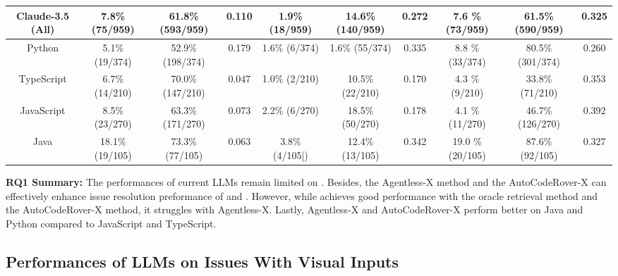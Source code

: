 \begin{table}[t]
{\begin{tabular}{cccccccccc}
    \textbf{Claude-3.5 (All)} &7.8\% (75/959) & 61.8\% (593/959) & 0.110 & 1.9\% 
 (18/959)& 14.6\%(140/959)& 0.272 &7.6 \% (73/959) & 61.5\% (590/959) & 0.325 \\
    \midrule
    \quad Python & 5.1\% (19/374) & 52.9\% (198/374) & 0.179 & 1.6\%  (6/374)& 1.6\% (55/374) &0.335 &8.8 \% (33/374) & 80.5\% (301/374) & 0.260\\
    \quad TypeScript & 6.7\% (14/210) & 70.0\% (147/210) & 0.047 & 1.0\% (2/210) & 10.5\% 
 (22/210)& 0.170 &4.3 \% (9/210) & 33.8\% (71/210) & 0.353 \\
    \quad JavaScript & 8.5\%  (23/270)& 63.3\% (171/270) & 0.073 & 2.2\% (6/270)& 18.5\% (50/270) & 0.178 &4.1 \% (11/270) & 46.7\% (126/270) & 0.392\\
    \quad Java & 18.1\% (19/105) & 73.3\% (77/105) & 0.063 &3.8\% (4/105|)& 12.4\% (13/105) & 0.342 &19.0 \% (20/105) & 87.6\% (92/105) & 0.327\\
    \bottomrule
    \end{tabular}
    }

\end{table}
\tabmargin

\begin{center} 
\begin{myboxc} \textbf{RQ1 Summary:} The performances of current LLMs remain limited on \Swebenchx. Besides, the Agentless-X method and the AutoCodeRover-X can effectively enhance issue resolution preformance of \GPT and \DeepSeek. However, while \Claude achieves good performance with the oracle retrieval method and the AutoCodeRover-X method, it struggles with Agentless-X. Lastly, Agentless-X and AutoCodeRover-X perform better on Java and Python compared to JavaScript and TypeScript. \end{myboxc} 
\end{center}

\subsection{Performances of LLMs on Issues With Visual Inputs }

